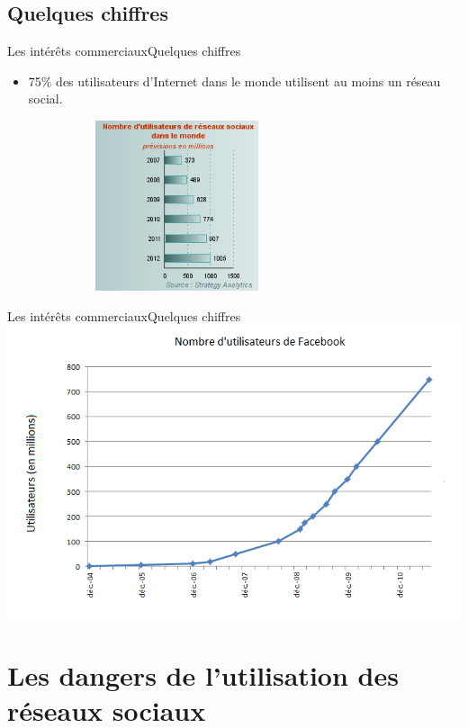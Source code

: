\documentclass{beamer}
\begin{document}
\subsection{Quelques chiffres}
\begin{frame}{Les intérêts commerciaux}{Quelques chiffres}
\begin{itemize}
	\item 75\% des utilisateurs d'Internet dans le monde utilisent au moins un réseau social.
\end{itemize}
	\includegraphics[width=10cm, height=5cm]{graphe1.png}
\end{frame}
\begin{frame}{Les intérêts commerciaux}{Quelques chiffres}
	\includegraphics[scale=0.5]{Facebook_users_fr.png}
\end{frame}
\section{Les dangers de l'utilisation des réseaux sociaux}
\end{document}
